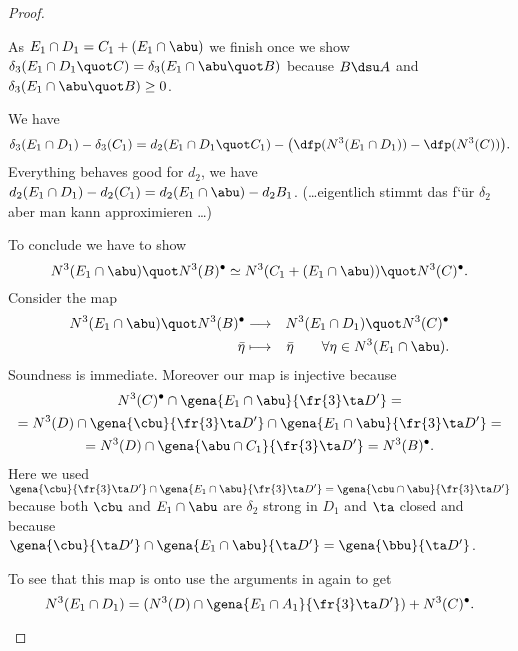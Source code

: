 \begin{proof}
\begin{itemize}
As $E_{1}\cap D_{1}=C_{1}+(E_{1}\cap \abu)$ we finish once we show
$\delta_{3}(E_{1}\cap D_{1}\quot C)=\delta_{3}(E_{1}\cap\abu\quot B)$ because
$B\dsu A$ and $\delta_{3}(E_{1}\cap \abu\quot B)\geq 0$.

We have
$$\delta_{3}(E_{1}\cap D_{1})-\delta_{3}(C_{1})=
d_{2}(E_{1}\cap D_{1}\quot C_{1})
-\big(\dfp(N^{3}(E_{1}\cap D_{1}))-\dfp(N^{3}(C))\big).$$
Everything behaves good for $d_{2}$, we have $d_{2}(E_{1}\cap D_{1})-d_{2}(C_{1})=
d_{2}(E_{1}\cap\abu)-d_{2}B_{1}$. (\dots eigentlich stimmt das f`\"ur $\delta_{2}$ aber
man kann approximieren \dots)

To conclude we have to show
$$N^{3}(E_{1}\cap\abu)\quot N^{3}(B)^{\bullet}\simeq
N^{3}(C_{1}+(E_{1}\cap \abu))\quot N^{3}(C)^{\bullet}.$$
Consider the map
\begin{eqnarray*}
N^{3}(E_{1}\cap \abu)\quot N^{3}(B)^{\bullet}&\longrightarrow&N^{3}(E_{1}\cap D_{1})\quot N^{3}(C)^{\bullet}\\
\bar\eta&\longmapsto&\bar\eta\quad\quad\forall\eta\in N^{3}(E_{1}\cap\abu).
\end{eqnarray*}
Soundness is immediate. Moreover our map is injective because
\begin{multline*}
N^{3}(C)^{\bullet}\cap\gena{E_{1}\cap \abu}{\fr{3}\ta D^{\prime}}=\\
=N^{3}(D)\cap\gena{\cbu}{\fr{3}\ta D^{\prime}}\cap\gena{E_{1}\cap \abu}{\fr{3}\ta D^{\prime}}=\\
=N^{3}(D)\cap\gena{\abu\cap C_{1}}{\fr{3}\ta D^{\prime}}=N^{3}(B)^{\bullet}.
\end{multline*}
Here we used $\gena{\cbu}{\fr{3}\ta D^{\prime}}\cap\gena{E_{1}\cap\abu}{\fr{3}\ta D^{\prime}}=
\gena{\cbu\cap\abu}{\fr{3}\ta D^{\prime}}$ because both $\cbu$ and $E_{1}\cap\abu$ are $\delta_{2}$ strong in $D_{1}$ and $\ta$ closed and because $\gena{\cbu}{\ta D^{\prime}}\cap\gena{E_{1}\cap\abu}{\ta D^{\prime}}=\gena{\bbu}{\ta D^{\prime}}$.

To see that this map is onto use the arguments in  again to get
$$N^{3}(E_{1}\cap D_{1})=(
N^{3}(D)\cap\gena{E_{1}\cap A_{1}}{\fr{3}\ta D^{\prime}})+N^{3}(C)^{\bullet}.$$


\end{itemize}
\end{proof}
